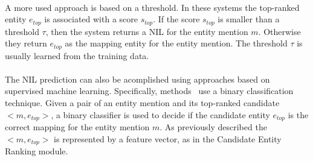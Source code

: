\paragraph{}
A more used approach is based on a threshold. In these systems the top-ranked entity $e_{top}$ is associated with a score $s_{top}$. If the score $s_{top}$ is smaller than a threshold $\tau$, then the system returns a NIL for the entity mention $m$. Otherwise they return $e_{top}$ as the mapping entity for the entity mention. The threshold $\tau$ is usually learned from the training data.
\paragraph{}
The NIL prediction can also be acomplished using approaches based on supervised machine learning. Specifically, methods~\cite{ratinov2011local, zheng2010learning} use a binary classification technique. Given a pair of an entity mention and its top-ranked candidate $<\!\!m, e_{top}\!\!>$, a binary classifier is used to decide if the candidate entity $e_{top}$ is the correct mapping for the entity mention $m$. As previously described the $<\!\!m, e_{top}\!\!>$ is represented by a feature vector, as in the Candidate Entity Ranking module.
